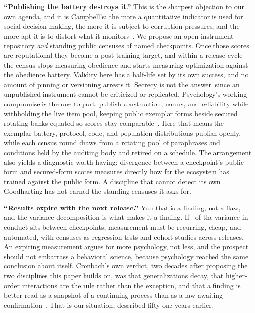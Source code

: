 \documentclass[journal]{IEEEtran}
\begin{document}
\textbf{``Publishing the battery destroys it.''} This is the sharpest
objection to our own agenda, and it is Campbell's: the more a
quantitative indicator is used for social decision-making, the more it
is subject to corruption pressures, and the more apt it is to distort
what it monitors~\cite{campbell1979assessing}. We propose an open
instrument repository \emph{and} standing public censuses of named
checkpoints. Once those scores are reputational they become a
post-training target, and within a release cycle the census stops
measuring obedience and starts measuring optimization against the
obedience battery. Validity here has a half-life set by its own
success, and no amount of pinning or versioning arrests it. Secrecy is
not the answer, since an unpublished instrument cannot be criticized
or replicated. Psychology's working compromise is the one to port:
publish construction, norms, and reliability while withholding the
live item pool, keeping public exemplar forms beside secured rotating
banks equated so scores stay comparable~\cite{embretson2000item}. Here
that means the exemplar battery, protocol, code, and population
distributions publish openly, while each census round draws from a
rotating pool of paraphrases and conditions held by the auditing body
and retired on a schedule. The arrangement also yields a diagnostic
worth having: divergence between a checkpoint's public-form and
secured-form scores measures directly how far the ecosystem has
trained against the public form. A discipline that cannot detect its
own Goodharting has not earned the standing censuses it asks for.

\textbf{``Results expire with the next release.''} Yes: that is a
finding, not a flaw, and the variance decomposition is what makes it
a finding. If \etaModel\ of the variance in conduct sits between
checkpoints, measurement must be recurring, cheap, and automated,
with censuses as regression tests and cohort studies across releases.
An expiring measurement argues for more psychology, not less, and
the prospect should not embarrass a behavioral science, because
psychology reached the same conclusion about itself. Cronbach's own
verdict, two decades after proposing the two disciplines this paper
builds on, was that generalizations decay, that higher-order
interactions are the rule rather than the exception, and that a
finding is better read as a snapshot of a continuing process than as a
law awaiting confirmation~\cite{cronbach1975beyond}. That is our
situation, described fifty-one years earlier.
\end{document}
